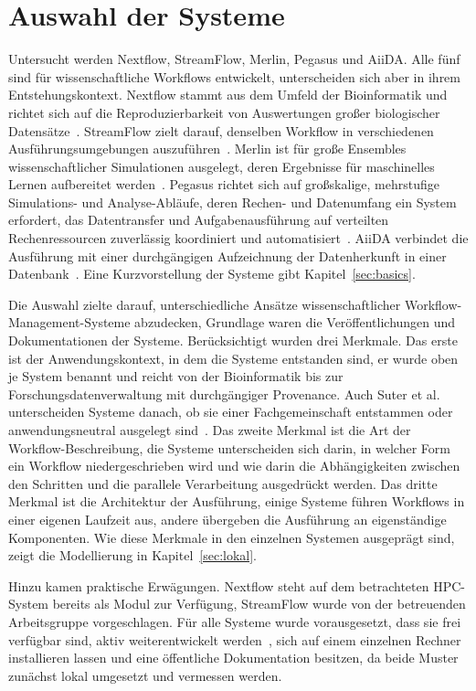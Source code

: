 \section{Auswahl der Systeme}
\label{sec:methodik:auswahl}
Untersucht werden Nextflow, StreamFlow, Merlin, Pegasus und AiiDA. Alle fünf sind für wissenschaftliche Workflows entwickelt, unterscheiden sich aber in ihrem Entstehungskontext. Nextflow stammt aus dem Umfeld der Bioinformatik und richtet sich auf die Reproduzierbarkeit von Auswertungen großer biologischer Datensätze~\cite[S.~316]{ditommaso2017nextflow}. StreamFlow zielt darauf, denselben Workflow in verschiedenen Ausführungsumgebungen auszuführen~\cite[S.~1723]{colonnelli2021streamflow}. Merlin ist für große Ensembles wissenschaftlicher Simulationen ausgelegt, deren Ergebnisse für maschinelles Lernen aufbereitet werden~\cite[S.~255]{peterson2022merlin}. Pegasus richtet sich auf großskalige, mehrstufige Simulations- und Analyse-Abläufe, deren Rechen- und Datenumfang ein System erfordert, das Datentransfer und Aufgabenausführung auf verteilten Rechenressourcen zuverlässig koordiniert und automatisiert~\cite[S.~17]{deelman2015pegasus}. AiiDA verbindet die Ausführung mit einer durchgängigen Aufzeichnung der Datenherkunft in einer Datenbank~\cite[S.~1]{huber2020aiida}. Eine Kurzvorstellung der Systeme gibt Kapitel~\ref{sec:basics}.

Die Auswahl zielte darauf, unterschiedliche Ansätze
wissenschaftlicher Workflow-Management-Systeme abzudecken, Grundlage
waren die Veröffentlichungen und Dokumentationen der Systeme.
Berücksichtigt wurden drei Merkmale. Das erste ist der
Anwendungskontext, in dem die Systeme entstanden sind, er wurde oben
je System benannt und reicht von der Bioinformatik bis zur
Forschungsdatenverwaltung mit durchgängiger Provenance. Auch Suter
et al. unterscheiden Systeme danach, ob sie einer Fachgemeinschaft
entstammen oder anwendungsneutral ausgelegt
sind~\cite[S.~4]{suter2026terminology}. Das zweite
Merkmal ist die Art der Workflow-Beschreibung, die Systeme
unterscheiden sich darin, in welcher Form ein Workflow
niedergeschrieben wird und wie darin die Abhängigkeiten zwischen den
Schritten und die parallele Verarbeitung ausgedrückt werden. Das
dritte Merkmal ist die Architektur der Ausführung, einige Systeme
führen Workflows in einer eigenen Laufzeit aus, andere übergeben die
Ausführung an eigenständige Komponenten. Wie diese Merkmale in den
einzelnen Systemen ausgeprägt sind, zeigt die Modellierung in
Kapitel~\ref{sec:lokal}.

Hinzu kamen praktische Erwägungen. Nextflow steht auf dem
betrachteten HPC-System bereits als Modul zur Verfügung, StreamFlow
wurde von der betreuenden Arbeitsgruppe vorgeschlagen.
Für alle Systeme wurde vorausgesetzt, dass sie frei verfügbar sind, aktiv
weiterentwickelt werden~\cite{wcisystems}, sich auf einem einzelnen
Rechner installieren lassen und eine öffentliche Dokumentation
besitzen, da beide Muster zunächst lokal umgesetzt und vermessen
werden.

